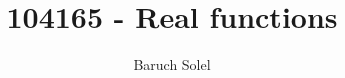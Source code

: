 \documentclass[]{article}
\title{104165 - Real functions}
\author{Baruch Solel}
\theoremstyle{bluestyle}
\theoremstyle{redstyle}
\theoremstyle{magentastyle}
\theoremstyle{olivestyle}
\theoremstyle{olivestyle}
\begin{document}
\maketitle

\begin{abstract}

\end{abstract}









\end{document}
